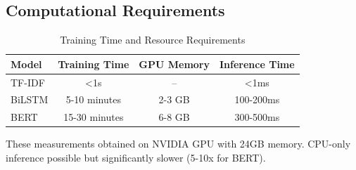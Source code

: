 \subsection{Computational Requirements}

\begin{table}[h!]
\centering
\caption{Training Time and Resource Requirements}
\label{tab:resources}
\begin{tabular}{|l|c|c|c|}
\hline
\textbf{Model} & \textbf{Training Time} & \textbf{GPU Memory} & \textbf{Inference Time} \\
\hline
TF-IDF & \textless 1s & -- & \textless 1ms \\
BiLSTM & 5-10 minutes & 2-3 GB & 100-200ms \\
BERT & 15-30 minutes & 6-8 GB & 300-500ms \\
\hline
\end{tabular}
\end{table}

These measurements obtained on NVIDIA GPU with 24GB memory. CPU-only inference possible but significantly slower (5-10x for BERT).
